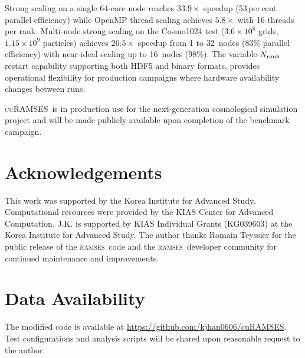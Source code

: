 \documentclass[fleqn,usenatbib]{mnras}
\newcommand{\ramses}{\textsc{ramses}}
\newcommand{\curamses}{\textsc{cuRAMSES}}
\newcommand{\nrank}{N_{\rm rank}}
\begin{document}
Strong scaling on a single 64-core node reaches $33.9\times$ speedup
(53\,per\,cent parallel efficiency) while OpenMP thread scaling
achieves $5.8\times$ with 16 threads per rank.  Multi-node strong
scaling on the Cosmo1024 test ($3.6 \times 10^8$ grids,
$1.15 \times 10^9$ particles) achieves $26.5\times$ speedup from 1
to 32~nodes ($83\%$ parallel efficiency) with near-ideal scaling up
to 16~nodes ($98\%$).  The variable-$\nrank$
restart capability supporting both HDF5 and binary formats, provides
operational flexibility for production campaigns where hardware
availability changes between runs.

\curamses\ is in production use for the next-generation cosmological simulation project and will be made publicly available upon completion of the benchmark campaign.


\section*{Acknowledgements}

This work was supported by the Korea Institute for Advanced Study. Computational resources were provided by the KIAS Center for Advanced Computation.  J.K. is supported by KIAS Individual Grants (KG039603) at the Korea Institute for Advanced Study. The author thanks Romain Teyssier for the public release of the \ramses\ code and the \ramses\ developer community for continued maintenance and improvements.


\section*{Data Availability}

The modified code is available at
\url{https://github.com/kjhan0606/cuRAMSES}. Test configurations
and analysis scripts will be shared upon reasonable request to the
author.



\end{document}
